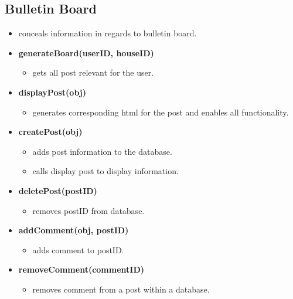 \documentclass[12pt]{article}
\begin{document}
\subsection{Bulletin Board}
\begin{itemize}
  \item conceals information in regards to bulletin board.
  \item \textbf{generateBoard(userID, houseID)}
    \begin{itemize}
    \item gets all post relevant for the user.
    \end{itemize}
  \item \textbf{displayPost(obj)}
    \begin{itemize}
    \item generates corresponding html for the post and enables all functionality.
    \end{itemize}
  \item \textbf{createPost(obj)}
    \begin{itemize}
    \item adds post information to the database.
    \item calls display post to display information.
    \end{itemize}
  \item \textbf{deletePost(postID)}
    \begin{itemize}
    \item removes postID from database.
    \end{itemize}
  \item \textbf{addComment(obj, postID)}
    \begin{itemize}
    \item adds comment to postID.
    \end{itemize}
  \item \textbf{removeComment(commentID)}
    \begin{itemize}
    \item removes comment from a post within a database.
    \end{itemize}
\end{itemize}
\end{document}
